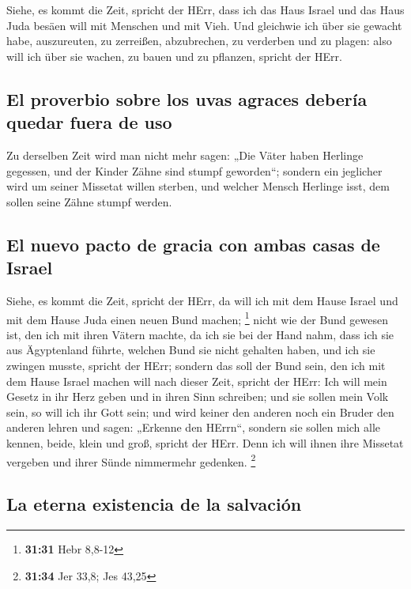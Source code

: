  Siehe, es kommt die Zeit, spricht der HErr, dass ich das
Haus Israel und das Haus Juda besäen will mit Menschen und mit Vieh.
 Und gleichwie ich über sie gewacht habe, auszureuten, zu
zerreißen, abzubrechen, zu verderben und zu plagen: also will ich über
sie wachen, zu bauen und zu pflanzen, spricht der HErr.

\hypertarget{el-proverbio-sobre-los-uvas-agraces-deberuxeda-quedar-fuera-de-uso}{%
\subsection{El proverbio sobre los uvas agraces debería quedar fuera de
uso}\label{el-proverbio-sobre-los-uvas-agraces-deberuxeda-quedar-fuera-de-uso}}

 Zu derselben Zeit wird man nicht mehr sagen: „Die Väter
haben Herlinge gegessen, und der Kinder Zähne sind stumpf geworden``;
 sondern ein jeglicher wird um seiner Missetat willen
sterben, und welcher Mensch Herlinge isst, dem sollen seine Zähne stumpf
werden.

\hypertarget{el-nuevo-pacto-de-gracia-con-ambas-casas-de-israel}{%
\subsection{El nuevo pacto de gracia con ambas casas de
Israel}\label{el-nuevo-pacto-de-gracia-con-ambas-casas-de-israel}}

 Siehe, es kommt die Zeit, spricht der HErr, da will ich
mit dem Hause Israel und mit dem Hause Juda einen neuen Bund machen;
\footnote{\textbf{31:31} Hebr 8,8-12}  nicht wie der Bund
gewesen ist, den ich mit ihren Vätern machte, da ich sie bei der Hand
nahm, dass ich sie aus Ägyptenland führte, welchen Bund sie nicht
gehalten haben, und ich sie zwingen musste, spricht der HErr;
 sondern das soll der Bund sein, den ich mit dem Hause
Israel machen will nach dieser Zeit, spricht der HErr: Ich will mein
Gesetz in ihr Herz geben und in ihren Sinn schreiben; und sie sollen
mein Volk sein, so will ich ihr Gott sein;  und wird
keiner den anderen noch ein Bruder den anderen lehren und sagen:
„Erkenne den HErrn``, sondern sie sollen mich alle kennen, beide, klein
und groß, spricht der HErr. Denn ich will ihnen ihre Missetat vergeben
und ihrer Sünde nimmermehr gedenken. \footnote{\textbf{31:34} Jer 33,8;
  Jes 43,25}

\hypertarget{la-eterna-existencia-de-la-salvaciuxf3n}{%
\subsection{La eterna existencia de la
salvación}\label{la-eterna-existencia-de-la-salvaciuxf3n}}

